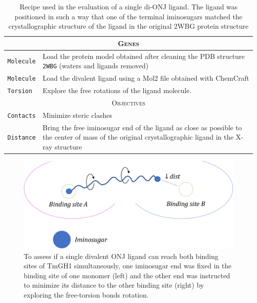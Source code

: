 \begin{table}[hbtp]
	\caption[Single di-ONJ recipe]{Recipe used in the evaluation of a single di-ONJ ligand. The ligand was positioned in such a way that one of the terminal iminosugars matched the crystallographic structure of the ligand in the original 2WBG protein structure}
	\label{table:recipe-single-divalent}
	\footnotesize
	\newcommand{\tableheading}[1]{\multicolumn{2}{c}{\textsc{#1}}}
	\begin{tabularx}{\textwidth}{RL}
		\toprule
		\tableheading{Genes}\\
		\toprule
		\texttt{Molecule} & Load the protein model obtained after cleaning the PDB structure \texttt{2WBG} (waters and ligands removed) \\
		\midrule
		\texttt{Molecule} & Load the divalent ligand using a Mol2 file obtained with ChemCraft \\
		\midrule
		\texttt{Torsion} & Explore the free rotations of the ligand molecule. \\
		\toprule
		\tableheading{Objectives}\\
		\toprule
		\texttt{Contacts} & Minimize steric clashes \\
		\midrule
		\texttt{Distance} & Bring the free iminosugar end of the ligand as close as possible to the center of mass of the original crystallographic ligand in the X-ray structure\cite{pdb:2wbg} \\

		\bottomrule

	\end{tabularx}
\end{table}


\begin{figure}[H] %
	\begin{Center}
		\includegraphics[width=\textwidth]{./figures/06/one-divalent-stretch-crop.pdf}
	\end{Center}
	\caption[Single di-ONJ inhibitor test]{To assess if a single divalent ONJ ligand can reach both binding sites of TmGH1 simultaneously, one iminosugar end was fixed in the binding site of one monomer (left) and the other end was instructed to minimize its distance to the other binding site (right) by exploring the free-torsion bonds rotation.}
	\label{fig:one-divalent-stretch}
\end{figure}



